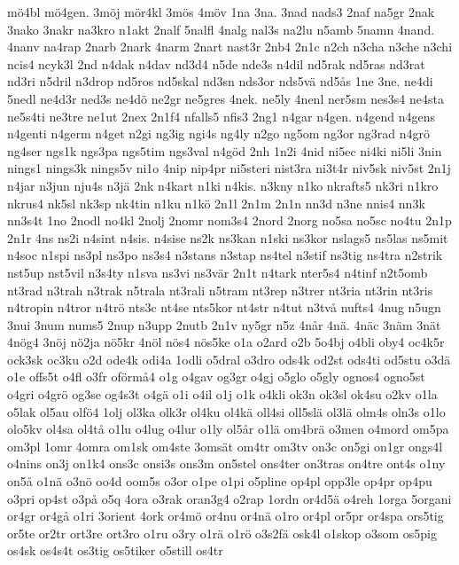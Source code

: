 {{m^^f64bl
m^^f64gen.
3m^^f6j
m^^f6r4kl
3m^^f6s
4m^^f6v
1na
3na.
3nad
nads3
2naf
na5gr
2nak
3nako
3nakr
na3kro
n1akt
2nalf
5nalfl
4nalg
nal3s
na2lu
n5amb
5namn
4nand.
4nanv
na4rap
2narb
2nark
4narm
2nart
nast3r
2nb4
2n1c
n2ch
n3cha
n3che
n3chi
ncis4
ncyk3l
2nd
n4dak
n4dav
nd3d4
n5de
nde3s
n4dil
nd5rak
nd5ras
nd3rat
nd3ri
n5dril
n3drop
nd5ros
nd5skal
nd3sn
nds3or
nds5v^^e4
nd5^^e5s
1ne
3ne.
ne4di
5nedl
ne4d3r
ned3s
ne4d^^f6
ne2gr
ne5gres
4nek.
ne5ly
4nenl
ner5sm
nes3s4
ne4sta
ne5s4ti
ne3tre
ne1ut
2nex
2n1f4
nfalls5
nfis3
2ng1
n4gar
n4gen.
n4gend
n4gens
n4genti
n4germ
n4get
n2gi
ng3ig
ngi4s
ng4ly
n2go
ng5om
ng3or
ng3rad
n4gr^^f6
ng4ser
ngs1k
ngs3pa
ngs5tim
ngs3val
n4g^^f6d
2nh
1n2i
4nid
ni5ec
ni4ki
ni5li
3nin
nings1
nings3k
nings5v
ni1o
4nip
nip4pr
ni5steri
nist3ra
ni3t4r
niv5sk
niv5st
2n1j
n4jar
n3jun
nju4s
n3j^^e4
2nk
n4kart
n1ki
n4kis.
n3kny
n1ko
nkrafts5
nk3ri
n1kro
nkrus4
nk5sl
nk3sp
nk4tin
n1ku
n1k^^f6
2n1l
2n1m
2n1n
nn3d
n3ne
nnis4
nn3k
nn3s4t
1no
2nodl
no4kl
2nolj
2nomr
nom3s4
2nord
2norg
no5sa
no5sc
no4tu
2n1p
2n1r
4ns
ns2i
n4sint
n4sis.
n4sise
ns2k
ns3kan
n1ski
ns3kor
nslags5
ns5las
ns5mit
n4soc
n1spi
ns3pl
ns3po
ns3s4
n3stans
n3stap
ns4tel
n3stif
ns3tig
ns4tra
n2strik
nst5up
nst5vil
n3s4ty
n1sva
ns3vi
ns3v^^e4r
2n1t
n4tark
nter5s4
n4tinf
n2t5omb
nt3rad
n3trah
n3trak
n5trala
nt3rali
n5tram
nt3rep
n3trer
nt3ria
nt3rin
nt3ris
n4tropin
n4tror
n4tr^^f6
nts3c
nt4se
nts5kor
nt4str
n4tut
n3tv^^e5
nufts4
4nug
n5ugn
3nui
3num
nums5
2nup
n3upp
2nutb
2n1v
ny5gr
n5z
4n^^e5r
4n^^e4.
4n^^e4c
3n^^e4m
3n^^e4t
4n^^f6g4
3n^^f6j
n^^f62ja
n^^f65kr
4n^^f6l
n^^f6s4
n^^f6s5ke
o1a
o2ard
o2b
5o4bj
o4bli
oby4
oc4k5r
ock3sk
oc3ku
o2d
ode4k
odi4a
1odli
o5dral
o3dro
ods4k
od2st
ods4ti
od5stu
o3d^^e4
o1e
offs5t
o4fl
o3fr
of^^f6rm^^e54
o1g
o4gav
og3gr
o4gj
o5glo
o5gly
ognos4
ogno5st
o4gri
o4gr^^f6
og3se
og4s3t
o4g^^e4
o1i
o4il
o1j
o1k
o4kli
ok3n
ok3sl
ok4su
o2kv
o1la
o5lak
ol5au
olf^^f64
1olj
ol3ka
olk3r
ol4ku
ol4k^^e4
oll4si
oll5sl^^e4
ol3l^^e4
olm4s
oln3s
o1lo
olo5kv
ol4sa
ol4t^^e5
o1lu
o4lug
o4lur
o1ly
ol5^^e5r
o1l^^e4
om4br^^e4
o3men
o4mord
om5pa
om3pl
1omr
4omra
om1sk
om4ste
3oms^^e4t
om4tr
om3tv
on3c
on5gi
on1gr
ongs4l
o4nins
on3j
on1k4
ons3c
onsi3s
ons3m
on5stel
ons4ter
on3tras
on4tre
ont4s
o1ny
on5^^e5
o1n^^e4
o3n^^f6
oo4d
oom5s
o3or
o1pe
o1pi
o5pline
op4pl
opp3le
op4pr
op4pu
o3pri
op4st
o3p^^e5
o5q
4ora
o3rak
oran3g4
o2rap
1ordn
or4d5^^e4
o4reh
1orga
5organi
or4gr
or4g^^e5
o1ri
3orient
4ork
or4m^^f6
or4nu
or4n^^e4
o1ro
or4pl
or5pr
or4spa
ors5tig
or5te
or2tr
ort3re
ort3ro
o1ru
o3ry
o1r^^e4
o1r^^f6
o3s2f^^e4
osk4l
o1skop
o3som
os5pig
os4sk
os4s4t
os3tig
os5tiker
o5still
os4tr
}}

